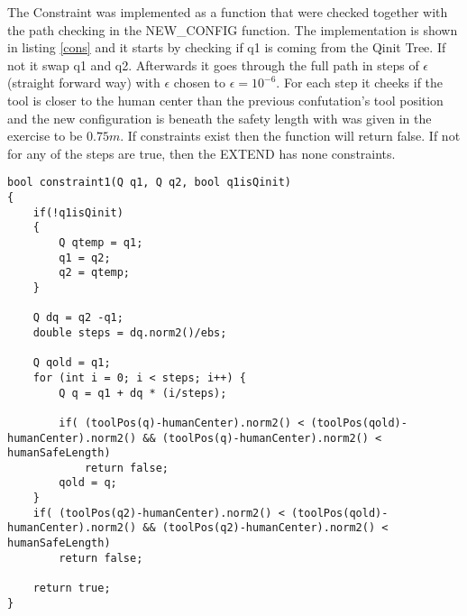 The Constraint was implemented as a function that were checked together with the path checking in the NEW\_CONFIG function. The implementation is shown in listing \ref{cons} and it starts by checking if q1 is coming from the Qinit Tree. If not it swap q1 and q2. Afterwards it goes through the full path in steps of $\epsilon $(straight forward way) with $\epsilon $ chosen to $\epsilon = 10^{-6}$. For each step it cheeks if the tool is closer to the human center than the previous confutation's tool position and the new configuration is beneath the safety length with was given in the exercise to be $0.75m$. If constraints exist then the function will return false. If not for any of the steps are true, then the EXTEND has none constraints.

\begin{lstlisting}[caption=The implementation of the planner, label=cons]
bool constraint1(Q q1, Q q2, bool q1isQinit)
{
    if(!q1isQinit)
    {
        Q qtemp = q1;
        q1 = q2;
        q2 = qtemp;
    }
    
    Q dq = q2 -q1;
    double steps = dq.norm2()/ebs;
    
    Q qold = q1;
    for (int i = 0; i < steps; i++) {
        Q q = q1 + dq * (i/steps);
        
        if( (toolPos(q)-humanCenter).norm2() < (toolPos(qold)-humanCenter).norm2() && (toolPos(q)-humanCenter).norm2() < humanSafeLength)
            return false;
        qold = q;
    }
    if( (toolPos(q2)-humanCenter).norm2() < (toolPos(qold)-humanCenter).norm2() && (toolPos(q2)-humanCenter).norm2() < humanSafeLength)
        return false;

	return true;
}
\end{lstlisting}